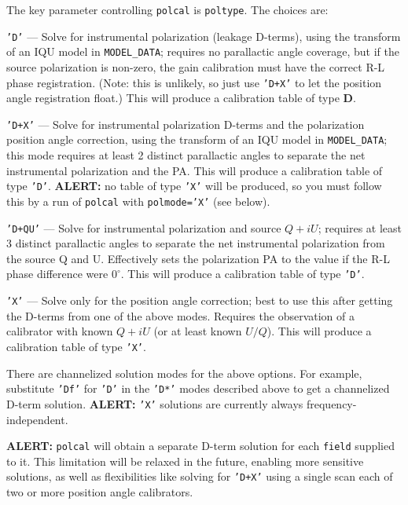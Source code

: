 The key parameter controlling {\tt polcal} is {\tt poltype}.  The
choices are:
\begin{description}
\item{\tt 'D'} --- Solve for instrumental polarization (leakage D-terms),
using the transform of an IQU model in {\tt MODEL\_DATA}; requires no
parallactic angle coverage, but if the source polarization is non-zero,
the gain calibration must have the correct R-L phase registration.
(Note: this is unlikely, so just use {\tt 'D+X'} to let the position
angle registration float.) This will produce a calibration table of
type {\bf D}.

\item{\tt 'D+X'} --- Solve for instrumental polarization D-terms and
the polarization position angle correction, using the transform of an
IQU model in {\tt MODEL\_DATA}; this mode requires at least 2 distinct
parallactic angles to separate the net instrumental polarization and
the PA. This will produce a calibration table of
type {\tt 'D'}. {\bf ALERT:} no table of type {\tt 'X'} will be
produced, so you must follow this by a run of {\tt polcal} with
{\tt polmode='X'} (see below).

\item{\tt 'D+QU'} --- Solve for instrumental polarization and source 
$Q+iU$; requires at least 3 distinct parallactic angles to separate
the net instrumental polarization from the source Q and U.
Effectively sets the polarization PA to the value if the R-L phase
difference were $0^\circ$.  This will produce a calibration table of
type {\tt 'D'}. 

\item{\tt 'X'} --- Solve only for the position angle correction; best to use
this after getting the D-terms from one of the above modes.  Requires
the observation of a calibrator with known $Q+iU$ (or at least known $U/Q$).
This will produce a calibration table of type {\tt 'X'}. 

\end{description}

There are channelized solution modes for the above options.  For
example, substitute {\tt 'Df'} for {\tt 'D'} in the {\tt 'D*'} modes 
described above to get a channelized D-term solution.  
{\bf ALERT:} {\tt 'X'} solutions are currently always
frequency-independent.

{\bf ALERT:} {\tt polcal} will obtain a separate D-term solution for
each {\tt field} supplied to it.  This limitation will be relaxed in 
the future, enabling more sensitive solutions, as well as
flexibilities like solving for {\tt 'D+X'} using a single scan each of two or
more position angle calibrators.

